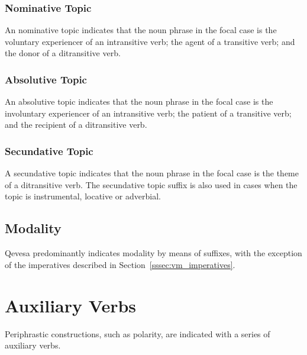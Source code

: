\documentclass[grammar]{subfiles}
\begin{document}


  \subsubsection{Nominative Topic}
  \label{sssec:vm_nom_topic}

  An nominative topic indicates that the noun phrase in the focal case is the voluntary experiencer of an intransitive verb; the agent of a transitive verb; and the donor of a ditransitive verb.

  \subsubsection{Absolutive Topic}
  \label{sssec:vm_abs_topic}

  An absolutive topic indicates that the noun phrase in the focal case is the involuntary experiencer of an intransitive verb; the patient of a transitive verb; and the recipient of a ditransitive verb. 

  \subsubsection{Secundative Topic}
  \label{sssec:vm_sdt_topic}

  A secundative topic indicates that the noun phrase in the focal case is the theme of a ditransitive verb.  The secundative topic suffix is also used in cases when the topic is instrumental, locative or adverbial.
  
  \subsection{Modality}
  \label{ssec:vm_modality}

  Qevesa predominantly indicates modality by means of suffixes, with the exception of the imperatives described in Section~\ref{sssec:vm_imperatives}. 
  
  \ToBeWritten

  \section{Auxiliary Verbs}
  \label{sec:vm_auxiliary}

  Periphrastic constructions, such as polarity, are indicated with a series of auxiliary verbs. 
\end{document}
